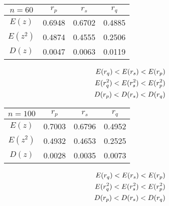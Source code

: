 \documentclass[12pt]{article}
\begin{document}
{\begin{multicols}{2}
    \begin{tabular}{ | c | c | c | c |}
    \hline
    $n = 60$           & $r_{p}$  & $r_s$  & $r_q$ \\ \hline
    $E(z)$               & 0.6948 & 0.6702 & 0.4885 \\ \hline
    $E(z^2)$             & 0.4874 & 0.4555 & 0.2506 \\ \hline
    $D(z)$               & 0.0047 & 0.0063 & 0.0119 \\ \hline
    \end{tabular}
    \columnbreak
    \begin{equation}
        \begin{aligned}
        \notag
            E(r_q) < E(r_s) < E(r_p) \\
            E(r^2_q) < E(r^2_s) < E(r^2_p) \\
            D(r_p) < D(r_s) < D(r_q)
        \end{aligned}
    \end{equation}
\end{multicols}

\begin{multicols}{2}
    \begin{tabular}{ | c | c | c | c |}
    \hline
    $n = 100$          & $r_{p}$  & $r_s$  & $r_q$ \\ \hline
    $E(z)$               & 0.7003 & 0.6796 & 0.4952 \\ \hline
    $E(z^2)$             & 0.4932 & 0.4653 & 0.2525 \\ \hline
    $D(z)$               & 0.0028 & 0.0035 & 0.0073 \\ \hline
    \end{tabular}
    \columnbreak
    \begin{equation}
        \begin{aligned}
        \notag
            E(r_q) < E(r_s) < E(r_p) \\
            E(r^2_q) < E(r^2_s) < E(r^2_p) \\
            D(r_p) < D(r_s) < D(r_q)
        \end{aligned}
    \end{equation}
\end{multicols}

\vspace{1.cm}


}
\end{document}
